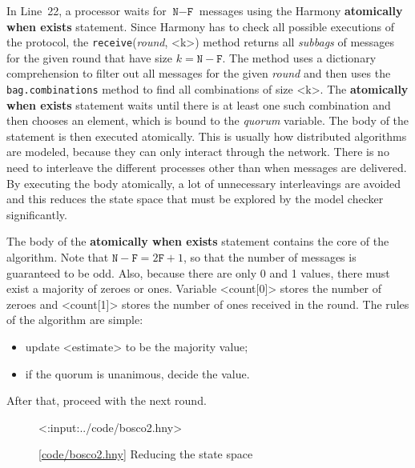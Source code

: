 \documentclass{report}
\newcommand{\harmonylink}[1]{%
[\href{https://harmony.cs.cornell.edu/#1}{\underline{#1}}]%
}
\newenvironment{code}{
\tcolorbox
}{
\endtcolorbox
}
\begin{document}
{In Line~22, a processor waits for $\texttt{N} - \texttt{F}$ messages using
the Harmony \textbf{atomically when exists} statement.
Since Harmony has to check all possible executions of the protocol, the
\texttt{receive}(\textit{round}, <{k}>) method returns all \emph{subbags} of messages
for the given round that have size $k = \texttt{N} - \texttt{F}$.  The method uses a
dictionary comprehension to filter out all messages for the given \textit{round}
and then uses the \texttt{bag.combinations} method to find all combinations of size <{k}>.
The \textbf{atomically when exists} statement waits until there is at least one such combination and
then chooses an element, which is bound to the \textit{quorum} variable.
The body of the statement is then executed atomically.
This is usually how distributed algorithms are modeled, because they can only interact
through the network.  There is no need to interleave the different processes other
than when messages are delivered.  By executing the body atomically, a lot of
unnecessary interleavings are avoided and this reduces the state space that must
be explored by the model checker significantly.

The body of the \textbf{atomically when exists} statement contains the core of the algorithm.
Note that $\texttt{N} - \texttt{F} = 2\texttt{F} + 1$, so that the number of
messages is guaranteed to be odd.  Also, because there are only 0 and 1 values, there
must exist a majority of zeroes or ones.  Variable <{count[0]}> stores the number
of zeroes and <{count[1]}> stores the number of ones received in the round.
The rules of the algorithm are simple:
\begin{itemize}
\item update <{estimate}> to be the majority value;
\item if the quorum is unanimous, decide the value.
\end{itemize}
After that, proceed with the next round.

\begin{figure}
\begin{code}
<{:input:../code/bosco2.hny}>
\end{code}
\caption{\harmonylink{code/bosco2.hny} Reducing the state space}
\label{fig:bosco2}
\end{figure}

}
\end{document}
